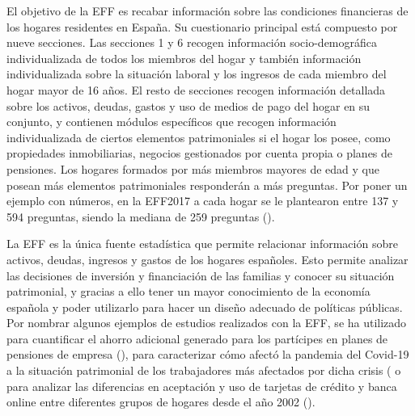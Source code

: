 El objetivo de la EFF es recabar información sobre las condiciones financieras de los hogares residentes en España. Su cuestionario principal está compuesto por nueve secciones. Las secciones 1 y 6 recogen información socio-demográfica individualizada de todos los miembros del hogar y también información individualizada sobre la situación laboral y los ingresos de cada miembro del hogar mayor de 16 años. El resto de secciones recogen información detallada sobre los activos, deudas, gastos y uso de medios de pago del hogar en su conjunto, y contienen módulos específicos que recogen información individualizada de ciertos elementos patrimoniales si el hogar los posee, como propiedades inmobiliarias, negocios gestionados por cuenta propia o planes de pensiones. Los hogares formados por más miembros mayores de edad y que posean más elementos patrimoniales responderán a más preguntas. Por poner un ejemplo con números, en la EFF2017 a cada hogar se le plantearon entre 137 y 594 preguntas, siendo la mediana de 259 preguntas (\cite{effmethod2017}).

La EFF es la única fuente estadística que permite relacionar información sobre activos, deudas, ingresos y gastos de los hogares españoles. Esto permite analizar las decisiones de inversión y financiación de las familias y conocer su situación patrimonial, y gracias a ello tener un mayor conocimiento de la economía española y poder utilizarlo para hacer un diseño adecuado de políticas públicas. Por nombrar algunos ejemplos de estudios realizados con la EFF, se ha utilizado para cuantificar el ahorro adicional generado para los partícipes en planes de pensiones de empresa (\cite{gomez2022pensiones}), para caracterizar cómo afectó la pandemia del Covid-19 a la situación patrimonial de los trabajadores más afectados por dicha crisis (\cite{alvargonzalez2020pandemia} o para analizar las diferencias en aceptación y uso de tarjetas de crédito y banca online entre diferentes grupos de hogares desde el año 2002 (\cite{crespo2023bancaonline}).

